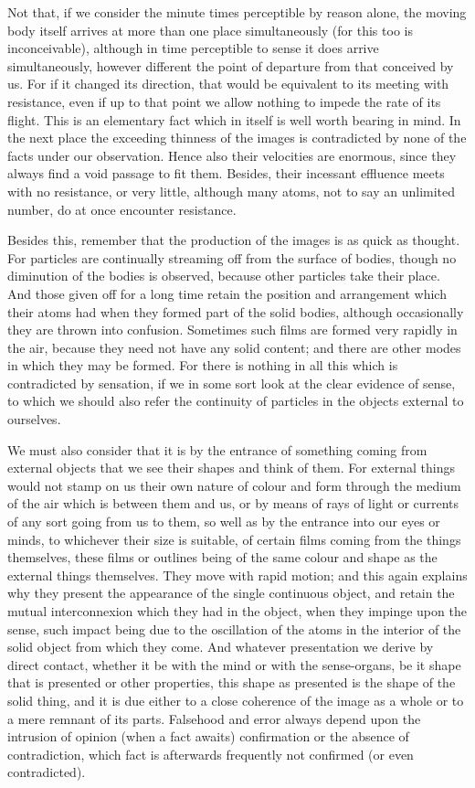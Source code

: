 \documentclass{stex}
\begin{document}
Not that, if we consider the minute times perceptible by reason alone, the moving body itself arrives at more than one place simultaneously (for this too is inconceivable), although in time perceptible to sense it does arrive simultaneously, however different the point of departure from that conceived by us.
For if it changed its direction, that would be equivalent to its meeting with resistance, even if up to that point we allow nothing to impede the rate of its flight.
This is an elementary fact which in itself is well worth bearing in mind.
In the next place the exceeding thinness of the images is contradicted by none of the facts under our observation.
Hence also their velocities are enormous, since they always find a void passage to fit them.
Besides, their incessant effluence meets with no resistance, or very little, although many atoms, not to say an unlimited number, do at once encounter resistance.

Besides this, remember that the production of the images is as quick as thought.
For particles are continually streaming off from the surface of bodies, though no diminution of the bodies is observed, because other particles take their place.
And those given off for a long time retain the position and arrangement which their atoms had when they formed part of the solid bodies, although occasionally they are thrown into confusion.
Sometimes such films are formed very rapidly in the air, because they need not have any solid content; and there are other modes in which they may be formed.
For there is nothing in all this which is contradicted by sensation, if we in some sort look at the clear evidence of sense, to which we should also refer the continuity of particles in the objects external to ourselves.

We must also consider that it is by the entrance of something coming from external objects that we see their shapes and think of them.
For external things would not stamp on us their own nature of colour and form through the medium of the air which is between them and us, or by means of rays of light or currents of any sort going from us to them, so well as by the entrance into our eyes or minds, to whichever their size is suitable, of certain films coming from the things themselves, these films or outlines being of the same colour and shape as the external things themselves.
They move with rapid motion; and this again explains why they present the appearance of the single continuous object, and retain the mutual interconnexion which they had in the object, when they impinge upon the sense, such impact being due to the oscillation of the atoms in the interior of the solid object from which they come.
And whatever presentation we derive by direct contact, whether it be with the mind or with the sense-organs, be it shape that is presented or other properties, this shape as presented is the shape of the solid thing, and it is due either to a close coherence of the image as a whole or to a mere remnant of its parts.
Falsehood and error always depend upon the intrusion of opinion (when a fact awaits) confirmation or the absence of contradiction, which fact is afterwards frequently not confirmed (or even contradicted).
\end{document}
